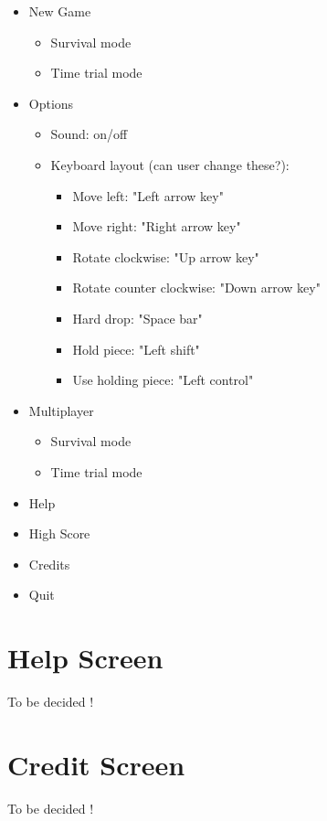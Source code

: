 \documentclass[10pt]{report}
\theoremstyle{definition}
\theoremstyle{remark}
\begin{document}
\begin{itemize}
\item New Game
    \begin{itemize}
    \item Survival mode
    \item Time trial mode
    \end{itemize}
\item Options
    \begin{itemize}
    \item Sound: on/off
    \item Keyboard layout (can user change these?):
        \begin{itemize}
        \item Move left: "Left arrow key"
        \item Move right: "Right arrow key"
        \item Rotate clockwise: "Up arrow key"
        \item Rotate counter clockwise: "Down arrow key"
        \item Hard drop: "Space bar"
        \item Hold piece: "Left shift"
        \item Use holding piece: "Left control"
        \end{itemize}
    \end{itemize}

\item Multiplayer
    \begin{itemize}
    \item Survival mode
    \item Time trial mode
    \end{itemize}

\item Help
\item High Score
\item Credits
\item Quit

\end{itemize}

\section{Help Screen}
To be decided !

\section{Credit Screen}
To be decided !
\end{document}
